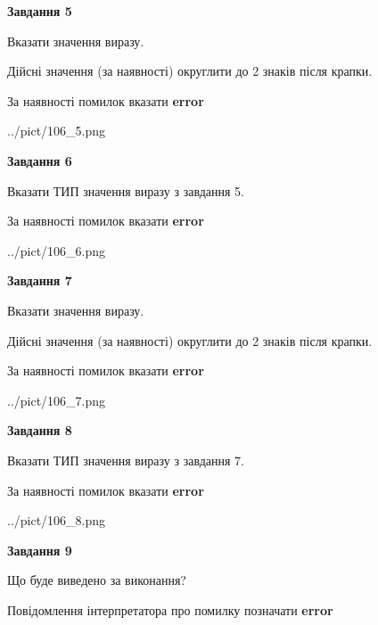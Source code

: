 \documentclass[11pt, ukrainian]{article}
\begin{document}
{\begin {large}
{\begin {center}\textbf{Завдання 5}\end {center}}\par
Вказати значення виразу. \par
Дійсні значення (за наявності) округлити до 2 знаків після крапки. \par
За наявності помилок вказати \textbf{error}

\begin{center}
	{../pict/106_5.png}
\end{center}
\newpage

{\begin {center}\textbf{Завдання 6}\end {center}}\par
Вказати ТИП значення виразу з завдання 5. \par
За наявності помилок вказати \textbf{error}

\begin{center}
	{../pict/106_6.png}
\end{center}
\newpage

{\begin {center}\textbf{Завдання 7}\end {center}}\par
Вказати значення виразу. \par
Дійсні значення (за наявності) округлити до 2 знаків після крапки. \par
За наявності помилок вказати \textbf{error}

\begin{center}
	{../pict/106_7.png}
\end{center}
\newpage

{\begin {center}\textbf{Завдання 8}\end {center}}\par
Вказати ТИП значення виразу з завдання 7. \par
За наявності помилок вказати \textbf{error}

\begin{center}
	{../pict/106_8.png}
\end{center}
\newpage

{\begin {center}\textbf{Завдання 9}\end {center}}\par
Що буде виведено за виконання? \par
Повідомлення інтерпретатора про помилку позначати \textbf{error}


\end{large}}
\end{document}
